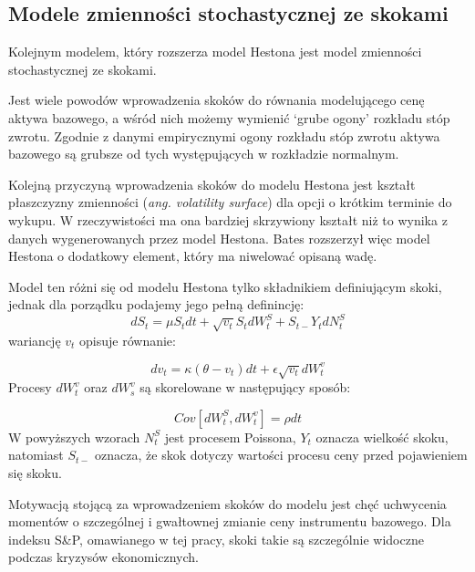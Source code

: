 \documentclass{pracamgr}
\begin{document}
\subsection{Modele zmienności stochastycznej ze skokami} %
\label{sec:modele_zmienno_ci_stochastycznej_ze_skokami}
 
Kolejnym modelem, który rozszerza model Hestona jest model zmienności stochastycznej ze skokami.

Jest wiele powodów wprowadzenia skoków do równania modelującego cenę aktywa bazowego, a wśród nich 
możemy wymienić `grube ogony' rozkładu stóp zwrotu. Zgodnie z danymi empirycznymi ogony rozkładu stóp 
zwrotu aktywa bazowego są grubsze od tych występujących w rozkładzie normalnym.

Kolejną przyczyną wprowadzenia skoków do modelu Hestona jest kształt płaszczyzny zmienności 
(\textit{ang. volatility surface}) dla opcji o krótkim terminie do wykupu. W rzeczywistości ma ona 
bardziej skrzywiony kształt niż to wynika z danych wygenerowanych przez model Hestona. 
Bates \cite{Bates} rozszerzył więc model Hestona o dodatkowy element, który ma niwelować opisaną wadę.

Model ten różni się od modelu Hestona tylko składnikiem definiującym skoki, jednak dla
porządku podajemy jego pełną definincję:
\begin{equation}
dS_t  = \mu S_t dt + \sqrt{v_t} S_t dW^S_t + S_{t-} Y_t dN_t^S
\end{equation}
wariancję $v_t$ opisuje równanie: 

\begin{equation}
dv_t  = \kappa (\theta - v_t)dt + \epsilon \sqrt{v_t} dW_t^v 
\end{equation}
Procesy $dW_t^v$ oraz $dW_s^v$ są skorelowane w następujący sposób:

\begin{equation}
Cov[dW^S_t, dW^v_t] = \rho dt 
\end{equation}
W powyższych wzorach $N_t^S$ jest procesem Poissona, $Y_t$ oznacza wielkość skoku, 
natomiast $S_{t-}$ oznacza, że skok dotyczy wartości procesu ceny przed pojawieniem się skoku.

Motywacją stojącą za wprowadzeniem skoków do modelu jest chęć uchwycenia momentów o 
szczególnej i gwałtownej zmianie ceny instrumentu bazowego. Dla indeksu S\&P, omawianego w tej pracy,
skoki takie są szczególnie widoczne podczas kryzysów ekonomicznych. 



 
\end{document}
